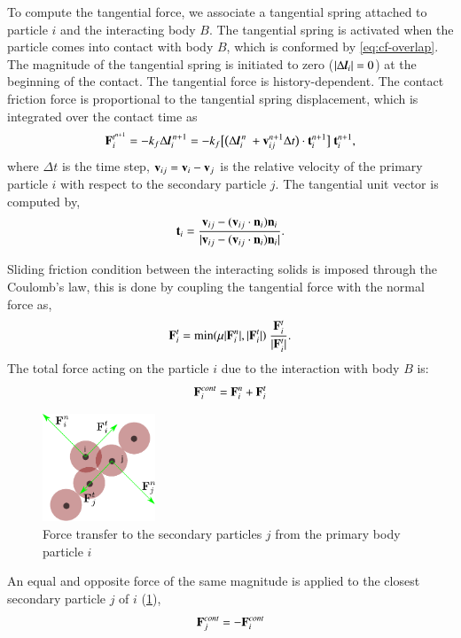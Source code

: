 To compute the tangential force, we associate a tangential spring attached to
particle $i$ and the interacting body $B$. The tangential spring is activated
when the particle comes into contact with body $B$, which is conformed by
\cref{eq:cf-overlap}. The magnitude of the tangential spring is initiated to
zero ($|\Delta \textit{\textbf{l}}_i|=0$) at the beginning of the contact. The
tangential force is history-dependent. The contact friction force is
proportional to the tangential spring displacement, which is integrated over
the contact time as
\begin{equation}
  \label{eq:tangential-force}
  \mathbf{F}_{i}^{t^{n+1}} =
  -k_f \Delta \textit{\textbf{l}}_i^{\,n + 1} =
  -k_f \big[\big(\Delta {\textit{\textbf{l}}}_i^{\,n} \
  + \mathbf{v}_{ij}^{n + 1} \Delta t\big) \cdot \mathbf{t}_i^{n + 1} \big] \
  \mathbf{t}_i^{n + 1},
\end{equation}
where $\Delta t$ is the time step, $\mathbf{v}_{ij} = \mathbf{v}_{i} - \mathbf{v}_j$ is
the relative velocity of the primary particle $i$ with respect to the
secondary particle $j$. The tangential unit vector is computed by,
\begin{equation}
  \label{eq:tangential-vect}
  \mathbf{t}_i = \frac{\mathbf{v}_{ij} - (\mathbf{v}_{ij} \cdot \mathbf{n}_i) \mathbf{n}_i}{|\mathbf{v}_{ij} - (\mathbf{v}_{ij} \cdot \mathbf{n}_i) \mathbf{n}_i|}.
\end{equation}

Sliding friction condition between the interacting solids is imposed through
the Coulomb's law, this is done by coupling the tangential force with the
normal force as,
\begin{equation}
  \label{eq:Coulomb-law}
  \mathbf{F}_{i}^{t} = \min(\mu |\mathbf{F}_{i}^{n}|, |\mathbf{F}_{i}^{t}|) \
  \frac{\mathbf{F}_{i}^{t}}{|\mathbf{F}_{i}^{t}|}.
\end{equation}
The total force acting on the particle $i$ due to the
interaction with body $B$ is:
\begin{equation}
  \label{eq:contact-force}
  \mathbf{F}_{i}^{cont} = \mathbf{F}_{i}^{n} + \mathbf{F}_{i}^{t}
\end{equation}

\begin{figure}[!htpb]
  \centering
  \includegraphics[width=0.3\textwidth]{images/rfc/images/contact_force/contact_force_description_3}
  \caption{Force transfer to the secondary particles $j$ from the primary body particle $i$}
\label{fig:rfc:secondary_particle_contact_foce_transfer}
\end{figure}
An equal and opposite force of the same magnitude is applied to the closest
secondary particle $j$ of $i$ (\cref{fig:rfc:secondary_particle_contact_foce_transfer}),
\begin{equation}
  \label{eq:contact-force}
  \mathbf{F}_{j}^{cont} = - \mathbf{F}_{i}^{cont}
\end{equation}

